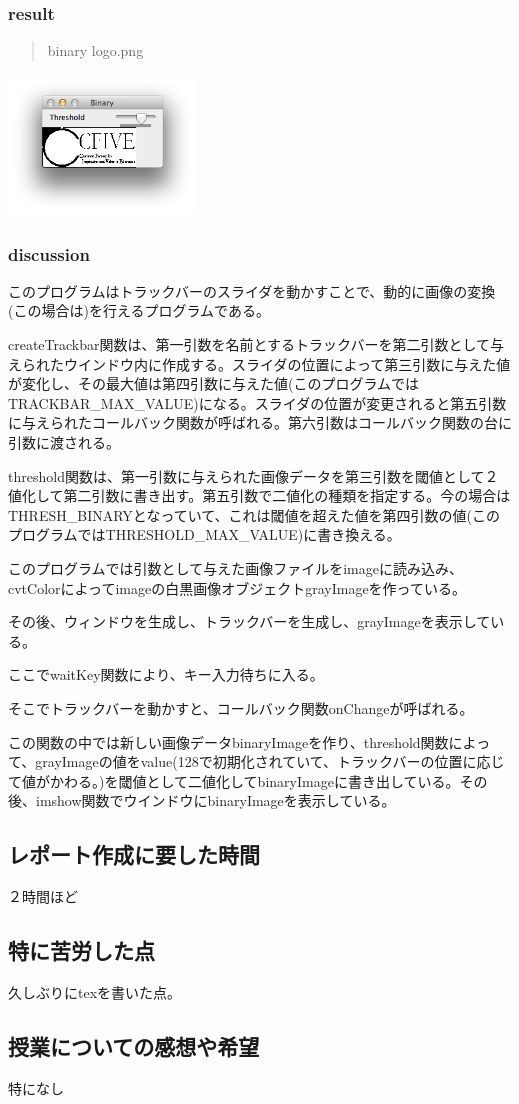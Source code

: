 \documentclass{jsarticle}
\begin{document}
\subsubsection{result}
\begin{quote}
binary logo.png
\end{quote}

\includegraphics[width=5cm]{binary.png}

\subsubsection{discussion}
このプログラムはトラックバーのスライダを動かすことで、動的に画像の変換(この場合は)を行えるプログラムである。

createTrackbar関数は、第一引数を名前とするトラックバーを第二引数として与えられたウインドウ内に作成する。スライダの位置によって第三引数に与えた値が変化し、その最大値は第四引数に与えた値(このプログラムではTRACKBAR\_MAX\_VALUE)になる。スライダの位置が変更されると第五引数に与えられたコールバック関数が呼ばれる。第六引数はコールバック関数の台に引数に渡される。

threshold関数は、第一引数に与えられた画像データを第三引数を閾値として２値化して第二引数に書き出す。第五引数で二値化の種類を指定する。今の場合はTHRESH\_BINARYとなっていて、これは閾値を超えた値を第四引数の値(このプログラムではTHRESHOLD\_MAX\_VALUE)に書き換える。

このプログラムでは引数として与えた画像ファイルをimageに読み込み、cvtColorによってimageの白黒画像オブジェクトgrayImageを作っている。

その後、ウィンドウを生成し、トラックバーを生成し、grayImageを表示している。

ここでwaitKey関数により、キー入力待ちに入る。

そこでトラックバーを動かすと、コールバック関数onChangeが呼ばれる。

この関数の中では新しい画像データbinaryImageを作り、threshold関数によって、grayImageの値をvalue(128で初期化されていて、トラックバーの位置に応じて値がかわる。)を閾値として二値化してbinaryImageに書き出している。その後、imshow関数でウインドウにbinaryImageを表示している。

\subsection{レポート作成に要した時間}
２時間ほど
\subsection{特に苦労した点}
久しぶりにtexを書いた点。
\subsection{授業についての感想や希望}
特になし
\end{document}
